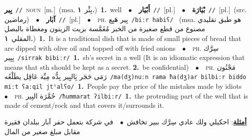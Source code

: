 \documentclass[10pt,a4paper,twoside]{article} %
\begin{document}
\begin{multicols}{2}
{\setlength\topsep{0pt}\textbf{\foreignlanguage{arabic}{بِير}}\ {\color{gray}\texttt{//}\color{black}}\ \textsc{noun}\ [m.]\ \color{gray}(msa. \foreignlanguage{arabic}{بِئْر}~\foreignlanguage{arabic}{\textbf{١.}})\color{black}\ \textbf{1.}~well\ \ $\bullet$\ \ \setlength\topsep{0pt}\textbf{\foreignlanguage{arabic}{أَبْيَار}}\ {\color{gray}\texttt{//}\color{black}}\ [pl.]\ \ $\bullet$\ \ \setlength\topsep{0pt}\textbf{\foreignlanguage{arabic}{بْيَارَة}}\ {\color{gray}\texttt{//}\color{black}}\ [pl.]\ (src. \color{gray}\foreignlanguage{arabic}{رماضين}\color{black})\ \ $\bullet$\ \ \setlength\topsep{0pt}\textbf{\foreignlanguage{arabic}{آبَار}}\ {\color{gray}\texttt{//}\color{black}}\ [pl.]\ \ $\bullet$\ \ \textsc{ph.} \color{gray} \foreignlanguage{arabic}{بِير هَبِع}\color{black}\ {\color{gray}\texttt{/{\sffamily biːr habiʕ}/}\color{black}}\ \color{gray} (msa. \foreignlanguage{arabic}{هو طبق تقليدي مصنوع من قطع صغيرة من الخبز مُغَمَّسة بزيت الزيتون ومغطاة بالبصل المقلي}~\foreignlanguage{arabic}{\textbf{١.}})\color{black}\ \textbf{1.}~It is a traditional dish that is made of small pieces of bread that are dipped with olive oil and topped off with fried onions\ \ $\bullet$\ \ \textsc{ph.} \color{gray} \foreignlanguage{arabic}{سِرَّك بِبِير}\color{black}\ {\color{gray}\texttt{/{\sffamily sirrak bibiːr}/}\color{black}}\ \textbf{1.}~sb's secret in a well (It is an idiomatic expression that means that sth should be kept as a secret.  \textbf{2.}~be confidential)\ \ $\bullet$\ \ \textsc{ph.} \color{gray} \foreignlanguage{arabic}{مَجْنُون رَمَى حَجَر بَِالبِِير بِدُّه مِيِّة عَاقِل يطَلْعُه}\color{black}\ {\color{gray}\texttt{/{\sffamily ma(dʒ)nuːn rama ħa(dʒ)ar bilbiːr biddo miːt ʕaːqil jtˤalʕo}/}\color{black}}\ \textbf{1.}~People pay the price of the mistakes made by idiots\ \ $\bullet$\ \ \textsc{ph.} \color{gray} \foreignlanguage{arabic}{حُمَّرَة البِير}\color{black}\ {\color{gray}\texttt{/{\sffamily ħummarat ʔilbiːr}/}\color{black}}\ \textbf{1.}~the protruding part of the well that is made of cement/rock and that covers it/surrounds it.\  \begin{flushright}\color{gray}\foreignlanguage{arabic}{\textbf{\underline{\foreignlanguage{arabic}{أمثلة}}}: احكيلي ولك عادي سِرَّك ببير تخافش\ $\bullet$\ \  في شركة بتعمل حفر آبار ببلدان فقيرة مقابل مبلغ صغير من المال}\end{flushright}\color{black}} \vspace{2mm}


\end{multicols}
\end{document}
